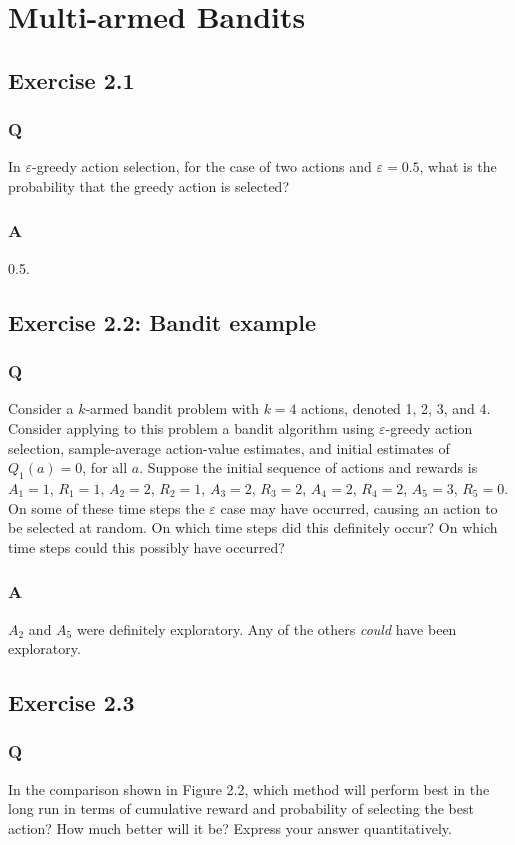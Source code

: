 \section{Multi-armed Bandits}
\subsection{Exercise 2.1}
\subsubsection{Q}
In $\varepsilon$-greedy action selection, for the case of two actions and $\varepsilon = 0.5$, what is the probability that the greedy action is selected?

\subsubsection{A}
0.5.


\subsection{Exercise 2.2: Bandit example}
\subsubsection{Q}
Consider a $k$-armed bandit problem with $k = 4$ actions, denoted 1, 2, 3, and 4. Consider applying to this problem a bandit algorithm using $\varepsilon$-greedy action selection, sample-average action-value estimates, and initial estimates of $Q_1(a) = 0$, for all $a$. Suppose the initial sequence of actions and rewards is $A_1 = 1$, $R_1 =1$, $A_2 =2$, $R_2 =1$, $A_3 =2$, $R_3 =2$, $A_4 =2$, $R_4 =2$, $A_5 =3$, $R_5 =0$. On some of these time steps the $\varepsilon$ case may have occurred, causing an action to be selected at random. On which time steps did this definitely occur? On which time steps could this possibly have occurred?

\subsubsection{A}
$A_2$ and $A_5$ were definitely exploratory. Any of the others \emph{could} have been exploratory.


\subsection{Exercise 2.3}
\subsubsection{Q}
In the comparison shown in Figure 2.2, which method will perform best in the long run in terms of cumulative reward and probability of selecting the best action? How much better will it be? Express your answer quantitatively.

